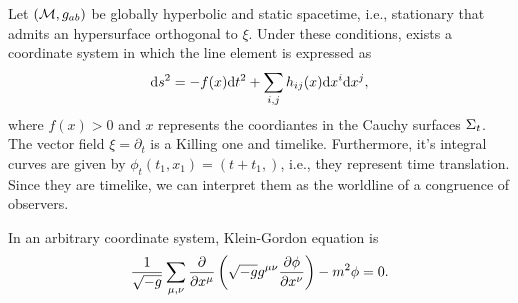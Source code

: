 Let \(({\mathcal{M}},g_{ab})\) be globally hyperbolic and static spacetime, i.e., stationary that admits an hypersurface orthogonal to \(\xi\). Under these conditions, exists a coordinate system in which the line element is expressed as
\begin{equation}
    \mathrm{d} s^2=-f(x)\mathrm{d} t^2+\sum_{i,j}h_{ij}(x)\mathrm{d} x^i\mathrm{d} x^j,
\end{equation}
where \(f(x)>0\) and \(x\) represents the coordiantes in the Cauchy surfaces \(\Sigma_t\). The vector field \(\xi=\partial_t\) is a Killing one and timelike. Furthermore, it's integral curves are given by \(\phi_t(t_1,x_1)=(t+t_1,)\), i.e., they represent time translation. Since they are timelike, we can interpret them as the worldline of a congruence of observers.

In an arbitrary coordinate system, Klein-Gordon equation is
\begin{equation}
    \frac{1}{\sqrt{-g}}\sum_{\mu,\nu}\diffp{}{x^{\mu}}\left(\sqrt{-g}g^{\mu\nu}\diffp{\phi}{x^\nu}\right)-m^2\phi=0.
\end{equation}


